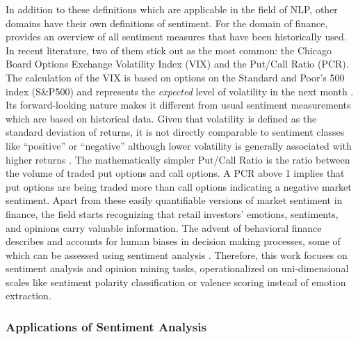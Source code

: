 In addition to these definitions which are applicable in the field of NLP, other domains have their own definitions of sentiment. For the domain of finance,  provides an overview of all sentiment measures that have been historically used. In recent literature, two of them stick out as the most common: the Chicago Board Options Exchange Volatility Index (VIX) and the Put/Call Ratio (PCR). The calculation of the VIX is based on options on the Standard and Poor's 500 index (S\&P500) and represents the \emph{expected} level of volatility in the next month . Its forward-looking nature makes it different from usual sentiment measurements which are based on historical data. Given that volatility is defined as the standard deviation of returns, it is not directly comparable to sentiment classes like ``positive'' or ``negative'' although lower volatility is generally associated with higher returns . The mathematically simpler Put/Call Ratio is the ratio between the volume of traded put options and call options. A PCR above 1 implies that put options are being traded more than call options indicating a negative market sentiment. Apart from these easily quantifiable versions of market sentiment in finance, the field starts recognizing that retail investors' emotions, sentiments, and opinions carry valuable information. The advent of behavioral finance describes and accounts for human biases in decision making processes, some of which can be assessed using sentiment analysis . Therefore, this work focuses on sentiment analysis and opinion mining tasks, operationalized on uni-dimensional scales like sentiment polarity classification or valence scoring instead of emotion extraction.


\subsubsection{Applications of Sentiment Analysis}

